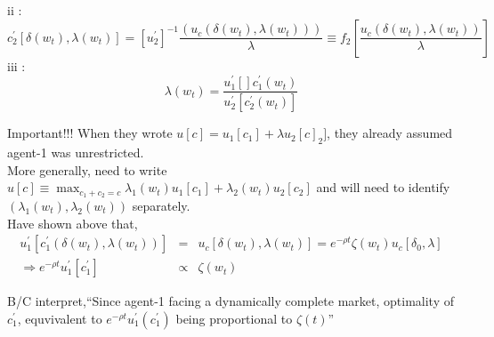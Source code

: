 \documentclass[]{article}
\begin{document}
ii :
\begin{equation}
c_2^\prime [\delta(w_t), \lambda (w_t)] = \left[u_2^\prime\right]^{-1} \frac{(u_c(\delta(w_t), \lambda(w_t)))}{\lambda} \equiv f_2\left[\frac{u_c(\delta(w_t), \lambda(w_t))}{\lambda}\right]\tag{19}
\end{equation}
iii : 
\begin{equation}
\lambda(w_t) = \frac{u_1^\prime []c_1^\prime(w_t) }{u_2^\prime[c_2^\prime(w_t)]}\tag{20}
\end{equation}

Important!!! When they wrote $u[c] = u_1[c_1] + \lambda u_2[c]_2]$, they already assumed agent-1 was unrestricted.\\

More generally, need to write $u[c] \equiv \max_{c_1+c_2=c} \lambda_1(w_t) u_1[c_1] + \lambda_2(w_t)u_2[c_2]$ and will need to identify $(\lambda_1(w_t), \lambda_2(w_t))$ separately.\\

Have shown above that, 
\begin{eqnarray*}
u_1^\prime[c_1^\prime(\delta(w_t), \lambda(w_t))] &=& u_c[\delta(w_t), \lambda(w_t)] = e^{-\rho t} \zeta(w_t) u_c[\delta_0, \lambda]\\
\Rightarrow e^{-\rho t} u_1^\prime[c_1^\prime] &\propto & \zeta(w_t)
\end{eqnarray*}

B/C interpret,``Since agent-1 facing a dynamically complete market, optimality of $c_1^\prime$, equvivalent to $e^{-\rho t} u_1^\prime(c_1^\prime)$ being proportional to $\zeta(t)$''\\
\end{document}
